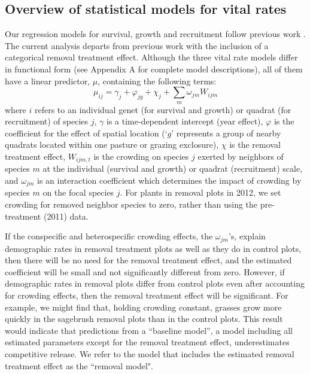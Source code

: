 \documentclass[11pt]{article}
\begin{document}
\begin{doublespacing}
\subsection*{Overview of statistical models for vital rates}

Our regression models for survival, growth and recruitment follow previous work \citep{adler_coexistence_2010,chu_large_2015}. The current analysis departs from previous work with the inclusion of a categorical removal treatment effect. Although the three vital rate models differ in functional form (see Appendix A for complete model descriptions), all of them have a linear predictor, $\mu$, containing the following terms:
\begin{equation}
\mu_{ij} = \gamma_j+ \varphi_{jg}+  \chi_j  + \sum \limits_{m} \omega_{jm} {W}_{ijm}
\label{eqn:survReg}
\end{equation}
where $i$ refers to an individual genet (for survival and growth) or quadrat (for recruitment) of species $j$, $\gamma$ is a time-dependent intercept (year effect), $\varphi$ is the coefficient for the effect of spatial location (`$g$' represents a group of nearby quadrats located within one pasture or grazing exclosure), $\chi$ is the removal treatment effect, 
$W_{ijm,t}$ is the crowding on species $j$ exerted by neighbors of species $m$ at the individual (survival and growth) or
quadrat (recruitment) scale, and $\omega_{jm}$ is an interaction coefficient which determines the impact of crowding by species $m$ on the 
focal species $j$. For plants in removal plots in 2012, we set crowding for removed neighbor species to zero, rather than using the pre-treatment (2011) data.

If the conspecific and heterospecific crowding effects, the $\omega_{jm}$'s, explain demographic rates in removal treatment plots as well as they do in control plots, then there will be no need for the removal treatment effect, and the estimated coefficient will be small and not significantly different from zero. However, if demographic rates in removal plots differ from control plots even after accounting for crowding effects, then the removal treatment effect will be significant. For example, we might find that, holding crowding constant, grasses grow more quickly in the sagebrush removal plots than in the control plots. This result would indicate that predictions from a ``baseline model'', a model including all estimated parameters except for the removal treatment effect, underestimates competitive release. We refer to the model that includes the estimated removal treatment effect as the ``removal model". 


\end{doublespacing}
\end{document}
